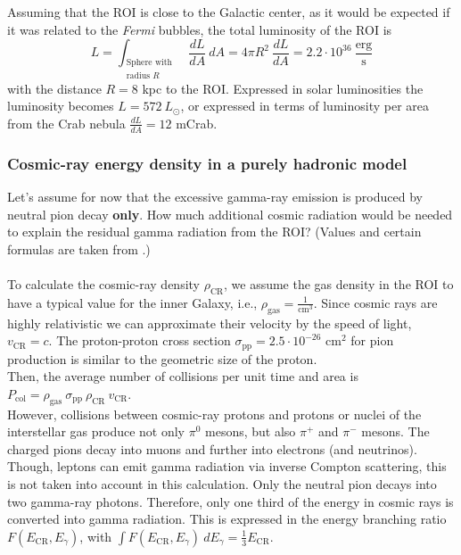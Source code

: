 \documentclass[a4paper]{article}
\begin{document}
Assuming that the ROI is close to the Galactic center, as it would be expected if it was related to the \textit{Fermi} bubbles, the total luminosity of the ROI is
\begin{equation}
\label{eq_L}
L = \int_{\substack{\text{Sphere with} \\ \text{radius }R}}\ \frac{dL}{dA}\ dA = 4 \pi R^2\ \frac{dL}{dA} = 2.2 \cdot 10^{36}\ \frac{\text{erg}}{\text{s}}
\end{equation}
with the distance $R = 8$ kpc to the ROI. Expressed in solar luminosities the luminosity becomes $L = 572\ L_\odot$, or expressed in terms of luminosity per area from the Crab nebula $\frac{dL}{dA} = 12 $ mCrab. 


\subsubsection{Cosmic-ray energy density in a purely hadronic model}
Let's assume for now that the excessive gamma-ray emission is produced by neutral pion decay \textbf{only}. How much additional cosmic radiation would be needed to explain the residual gamma radiation from the ROI? (Values and certain formulas are taken from \cite{Longair}.)\\
\\
To calculate the cosmic-ray density $\rho_{\text{CR}}$, we assume the gas density in the ROI to have a typical value for the inner Galaxy, i.e., $\rho_\text{gas} = \frac{1}{\text{cm}^3}$. Since cosmic rays are highly relativistic we can approximate their velocity by the speed of light, $v_\text{CR} = c$. The proton-proton cross section $\sigma_\text{pp} = 2.5 \cdot 10^{-26}$ cm$^2$ for pion production is similar to the geometric size of the proton.\\
Then, the average number of collisions per unit time and area is $P_\text{col} = \rho_{\text{gas}}\ \sigma_{\text{pp}}\ \rho_{\text{CR}}\ v_{\text{CR}}$.\\
However, collisions between cosmic-ray protons and protons or nuclei of the interstellar gas produce not only $\pi^0$ mesons, but also $\pi^+$ and $\pi^-$ mesons. The charged pions decay into muons and further into electrons (and neutrinos). Though, leptons can emit gamma radiation via inverse Compton scattering, this is not taken into account in this calculation. Only the neutral pion decays into two gamma-ray photons. Therefore, only one third of the energy in cosmic rays is converted into gamma radiation. This is expressed in the energy branching ratio $F(E_{\text{CR}}, E_\gamma)$, with $\int F(E_{\text{CR}}, E_\gamma)\ dE_\gamma = \frac{1}{3}E_\text{CR}$.
\end{document}
